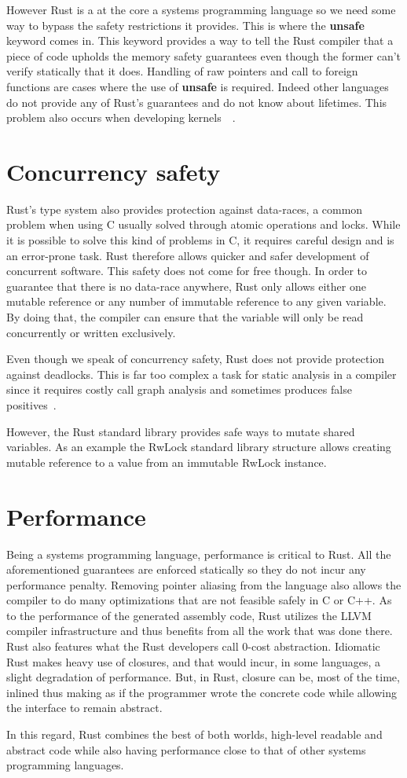 However Rust is a at the core a systems programming language so we
need some way to bypass the safety restrictions it provides. This is
where the \textbf{unsafe}~\cite{rustonomicon} keyword comes in. This
keyword provides a way to tell the Rust compiler that a piece of code
upholds the memory safety guarantees even though the former can't
verify  statically that it does. Handling of raw pointers and call to
foreign functions are cases where the use of \textbf{unsafe} is
required. Indeed other languages do not provide any of Rust's
guarantees and do not know about lifetimes. This problem also occurs
when developing kernels~\cite{rust-os}~\cite{redox}.

\section{Concurrency safety}

Rust's type system also provides protection against data-races, a
common problem when using C usually solved through atomic operations
and locks. While it is possible to solve this kind of problems in C,
it requires careful design and is an error-prone task. Rust therefore
allows quicker and safer development of concurrent software. This safety
does not come for free though. In order to guarantee that there is no
data-race anywhere, Rust only allows either one mutable reference or
any number of immutable reference to any given variable. By doing
that, the compiler can ensure that the variable will only be read
concurrently or written exclusively.

Even though we speak of concurrency safety, Rust does not provide
protection against deadlocks. This is far too complex a task for
static analysis in a compiler since it requires costly call graph
analysis and sometimes produces false
positives~\cite{deadlock-detection}.

However, the Rust standard library provides safe ways to mutate shared
variables. As an example the RwLock standard library structure allows
creating mutable reference to a value from an immutable RwLock instance.

\section{Performance}

Being a systems programming language, performance is critical to
Rust. All the aforementioned guarantees are enforced statically so
they do not incur any performance penalty. Removing pointer aliasing
from the language also allows the compiler to do many optimizations
that are not feasible safely in C or C++. As to the performance of the
generated assembly code, Rust utilizes the LLVM compiler
infrastructure and thus benefits from all the work that was done
there. Rust also features what the Rust developers call 0-cost
abstraction. Idiomatic Rust makes heavy use of closures, and that
would incur, in some languages, a slight degradation of
performance. But, in Rust, closure can be, most of the time, inlined
thus making as if the programmer wrote the concrete code while
allowing the interface to remain abstract.

In this regard, Rust combines the best of both worlds, high-level
readable and abstract code while also having performance close to that
of other systems programming languages.

